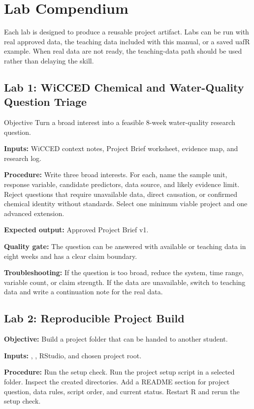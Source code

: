 \chapter{Lab Compendium}

Each lab is designed to produce a reusable project artifact. Labs can be run with real approved data, the teaching data included with this manual, or a saved uafR example. When real data are not ready, the teaching-data path should be used rather than delaying the skill.

\section{Lab 1: WiCCED Chemical and Water-Quality Question Triage}
\begin{programbox}{Objective}
Turn a broad interest into a feasible 8-week water-quality research question.
\end{programbox}
\textbf{Inputs:} WiCCED context notes, Project Brief worksheet, evidence map, and research log.

\textbf{Procedure:} Write three broad interests. For each, name the sample unit, response variable, candidate predictors, data source, and likely evidence limit. Reject questions that require unavailable data, direct causation, or confirmed chemical identity without standards. Select one minimum viable project and one advanced extension.

\textbf{Expected output:} Approved Project Brief v1.

\textbf{Quality gate:} The question can be answered with available or teaching data in eight weeks and has a clear claim boundary.

\textbf{Troubleshooting:} If the question is too broad, reduce the system, time range, variable count, or claim strength. If the data are unavailable, switch to teaching data and write a continuation note for the real data.

\section{Lab 2: Reproducible Project Build}
\textbf{Objective:} Build a project folder that can be handed to another student.

\textbf{Inputs:} , , RStudio, and chosen project root.

\textbf{Procedure:} Run the setup check. Run the project setup script in a selected folder. Inspect the created directories. Add a README section for project question, data rules, script order, and current status. Restart R and rerun the setup check.

